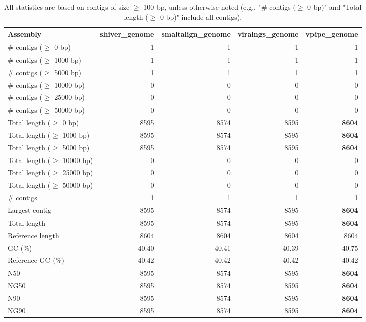 \documentclass[12pt,a4paper]{article}
\begin{document}
\begin{table}[ht]
\begin{center}
\caption{All statistics are based on contigs of size $\geq$ 100 bp, unless otherwise noted (e.g., "\# contigs ($\geq$ 0 bp)" and "Total length ($\geq$ 0 bp)" include all contigs).}
\begin{tabular}{|l*{4}{|r}|}
\hline
Assembly & shiver\_genome & smaltalign\_genome & viralngs\_genome & vpipe\_genome \\ \hline
\# contigs ($\geq$ 0 bp) & 1 & 1 & 1 & 1 \\ \hline
\# contigs ($\geq$ 1000 bp) & 1 & 1 & 1 & 1 \\ \hline
\# contigs ($\geq$ 5000 bp) & 1 & 1 & 1 & 1 \\ \hline
\# contigs ($\geq$ 10000 bp) & 0 & 0 & 0 & 0 \\ \hline
\# contigs ($\geq$ 25000 bp) & 0 & 0 & 0 & 0 \\ \hline
\# contigs ($\geq$ 50000 bp) & 0 & 0 & 0 & 0 \\ \hline
Total length ($\geq$ 0 bp) & 8595 & 8574 & 8595 & {\bf 8604} \\ \hline
Total length ($\geq$ 1000 bp) & 8595 & 8574 & 8595 & {\bf 8604} \\ \hline
Total length ($\geq$ 5000 bp) & 8595 & 8574 & 8595 & {\bf 8604} \\ \hline
Total length ($\geq$ 10000 bp) & 0 & 0 & 0 & 0 \\ \hline
Total length ($\geq$ 25000 bp) & 0 & 0 & 0 & 0 \\ \hline
Total length ($\geq$ 50000 bp) & 0 & 0 & 0 & 0 \\ \hline
\# contigs & 1 & 1 & 1 & 1 \\ \hline
Largest contig & 8595 & 8574 & 8595 & {\bf 8604} \\ \hline
Total length & 8595 & 8574 & 8595 & {\bf 8604} \\ \hline
Reference length & 8604 & 8604 & 8604 & 8604 \\ \hline
GC (\%) & 40.40 & 40.41 & 40.39 & 40.75 \\ \hline
Reference GC (\%) & 40.42 & 40.42 & 40.42 & 40.42 \\ \hline
N50 & 8595 & 8574 & 8595 & {\bf 8604} \\ \hline
NG50 & 8595 & 8574 & 8595 & {\bf 8604} \\ \hline
N90 & 8595 & 8574 & 8595 & {\bf 8604} \\ \hline
NG90 & 8595 & 8574 & 8595 & {\bf 8604} \\ \hline

\end{tabular}
\end{center}
\end{table}
\end{document}
